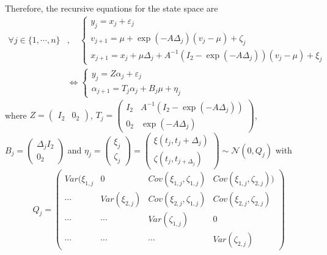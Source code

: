 \documentclass[11pt]{article}
\newcommand {\1}{\mathbb{1}}
\theoremstyle{definition}
\theoremstyle{remark}
\theoremstyle{remark}
\begin{document}
Therefore, the recursive equations for the state space are
\begin{align*}
	\forall j \in \{1, \cdots, n\}&, \quad 
	\left\{ \begin{array}{l}
		y_j=x_j+\varepsilon_j \\
		v_{j+1}=\mu +\exp(-A\Delta_j)(v_j-\mu)+\zeta_j \\
		x_{j+1}=x_j+\mu \Delta_j+A^{-1}(I_2-\exp(-A\Delta_j))(v_j-\mu)+\xi_j
	\end{array}\right. \\
	&\Leftrightarrow \left\{ \begin{array}{l}
		y_j=Z\alpha_j+\varepsilon_j \\
		\alpha_{j+1}=T_j \alpha_j+B_j \mu + \eta_j
	\end{array}\right.
\end{align*}
where $Z=\begin{pmatrix} I_2 & 0_2 \end{pmatrix}$, $T_j=\begin{pmatrix} I_2 & A^{-1}(I_2-\exp(-A\Delta_j)) \\
	0_2 & \exp(-A\Delta_j) \end{pmatrix}$, $B_j=\begin{pmatrix}
	\Delta_j I_2 \\
	0_2 \end{pmatrix}$ and $\eta_j=\begin{pmatrix} \xi_j \\ \zeta_j\end{pmatrix}=\begin{pmatrix} \xi(t_j,t_j+\Delta_j) \\ \zeta(t_j,t_{j+\Delta_j})\end{pmatrix} \sim \mathcal{N}(0,Q_j)$ with 
\[Q_j=\begin{pmatrix} 
	Var(\xi_{1,j} & 0 & Cov(\xi_{1,j},\zeta_{1,j}) & Cov(\xi_{1,j},\zeta_{2,j})) \\
	\cdots & Var(\xi_{2,j}) & Cov(\xi_{2,j}, \zeta_{1,j}) & Cov(\xi_{2,j},\zeta_{2,j}) \\
	\cdots & \cdots & Var(\zeta_{1,j}) & 0 \\
	\cdots & \cdots & \cdots & Var(\zeta_{2,j}) 
\end{pmatrix}\] 
\end{document}
